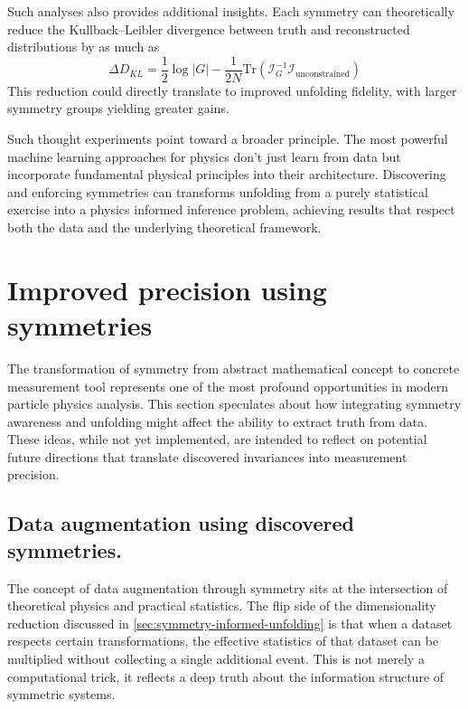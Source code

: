         Such analyses also provides additional insights.
        Each symmetry can theoretically reduce the Kullback--Leibler divergence between truth and reconstructed distributions by as much as
        \[
            \Delta D_{KL} = \frac{1}{2} \log |G| - \frac{1}{2N} \text{Tr}(\mathcal{I}_G^{-1} \mathcal{I}_\text{unconstrained})
        \]
        This reduction could directly translate to improved unfolding fidelity, with larger symmetry groups yielding greater gains.

        Such thought experiments point toward a broader principle.
        The most powerful machine learning approaches for physics don't just learn from data but incorporate fundamental physical principles into their architecture.
        Discovering and enforcing symmetries can transforms unfolding from a purely statistical exercise into a physics informed inference problem, achieving results that respect both the data and the underlying theoretical framework.

\section{Improved precision using symmetries}
\label{sec:improved-measurement-prediction}
    The transformation of symmetry from abstract mathematical concept to concrete measurement tool represents one of the most profound opportunities in modern particle physics analysis.
    This section speculates about how integrating symmetry awareness and unfolding might affect the ability to extract truth from data.
    These ideas, while not yet implemented, are intended to reflect on potential future directions that translate discovered invariances into measurement precision.
    \subsection{Data augmentation using discovered symmetries.}
        The concept of data augmentation through symmetry sits at the intersection of theoretical physics and practical statistics.
        The flip side of the dimensionality reduction discussed in \cref{sec:symmetry-informed-unfolding} is that when a dataset respects certain transformations, the effective statistics of that dataset can be multiplied without collecting a single additional event.
        This is not merely a computational trick, it reflects a deep truth about the information structure of symmetric systems.

